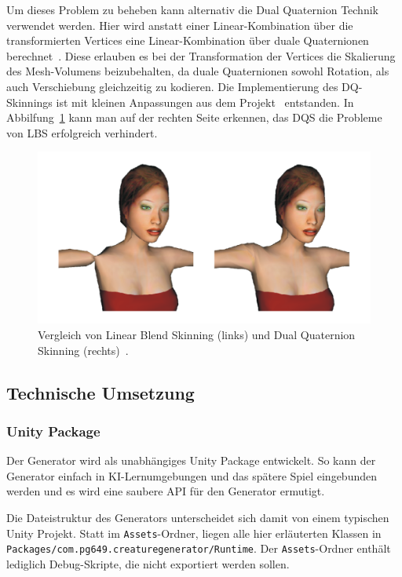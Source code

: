 Um dieses Problem zu beheben kann alternativ die Dual Quaternion Technik verwendet werden. Hier wird anstatt einer Linear-Kombination über die transformierten Vertices eine Linear-Kombination über duale Quaternionen berechnet~\cite{dqs}. Diese erlauben es bei der Transformation der Vertices die Skalierung des Mesh-Volumens beizubehalten, da duale Quaternionen sowohl Rotation, als auch Verschiebung gleichzeitig zu kodieren. Die Implementierung des DQ-Skinnings ist mit kleinen Anpassungen aus dem Projekt~\cite{dqs_github} entstanden. In Abbilfung~\ref{fig:dqs} kann man auf der rechten Seite erkennen, das DQS die Probleme von LBS erfolgreich verhindert.

\begin{figure}[h!]
	\centering
	\includegraphics[width=0.7\linewidth]{resources/img/dqs.png}
	\caption{Vergleich von Linear Blend Skinning (links) und Dual Quaternion Skinning (rechts)~\cite{dqs}.}
	\label{fig:dqs}
\end{figure}






\subsection{Technische Umsetzung}

\subsubsection{Unity Package}
Der Generator wird als unabhängiges Unity Package entwickelt.
So kann der Generator einfach in KI-Lernumgebungen und das spätere Spiel eingebunden werden und es wird eine saubere API für den Generator ermutigt.

Die Dateistruktur des Generators unterscheidet sich damit von einem typischen Unity Projekt. Statt im \texttt{Assets}-Ordner, liegen alle hier erläuterten Klassen in \linebreak\texttt{Packages/com.pg649.creaturegenerator/Runtime}.
Der \texttt{Assets}-Ordner enthält lediglich Debug-Skripte, die nicht exportiert werden sollen.

